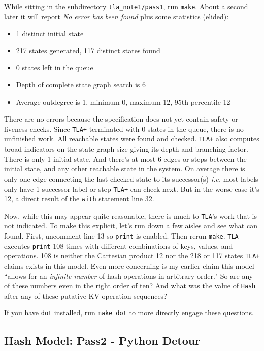 \documentclass[twocolumn]{article}
\begin{document}
While sitting in the subdirectory \texttt{tla\_note1/pass1}, run \texttt{make}. About a second later it will report \emph{No error has been found} plus some statistics (elided):

\begin{itemize}
\item 1 distinct initial state
\item 217 states generated, 117 distinct states found
\item 0 states left in the queue
\item Depth of complete state graph search is 6
\item Average outdegree is 1, minimum 0, maximum 12, 95th percentile 12
\end{itemize}

There are no errors because the specification does not yet contain safety or liveness checks. Since \texttt{TLA+} terminated with 0 states in the queue, there is no unfinished work. All reachable states were found and checked. \texttt{TLA+} also computes broad indicators on the state graph size giving its depth and branching factor. There is only 1 initial state. And there's at most 6 edges or steps between the initial state, and any other reachable state in the system. On average there is only one edge connecting the last checked state to its successor(s) \emph{i.e.} most labels only have 1 successor label or step \texttt{TLA+} can check next. But in the worse case it's 12, a direct result of the \texttt{with} statement line 32.

Now, while this may appear quite reasonable, there is much to \texttt{TLA}'s work that is not indicated. To make this explicit, let's run down a few aisles and see what can found. First, uncomment line 13 so \texttt{print} is enabled. Then rerun \texttt{make}. \texttt{TLA} executes \texttt{print} 108 times with different combinations of keys, values, and operations. 108 is neither the Cartesian product 12 nor the 218 or 117 states \texttt{TLA+} claims exists in this model. Even more concerning is my earlier claim this model ``allows for an \emph{infinite number} of hash operations in arbitrary order." So are any of these numbers even in the right order of ten? And what was the value of \texttt{Hash} after any of these putative KV operation sequences?

If you have \texttt{dot} installed, run \texttt{make dot} to more directly engage these questions.

\subsection{Hash Model: Pass2 - Python Detour}
\end{document}

